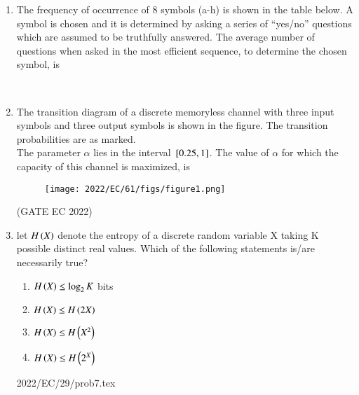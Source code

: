 \begin{enumerate}
\item The frequency of occurrence of 8 symbols (a-h) is shown in the table below. A
symbol is chosen and it is determined by asking a series of “yes/no” questions which
are assumed to be truthfully answered. The average number of questions when asked
in the most efficient sequence, to determine the chosen symbol, is \\
\begin{table}[h]
	
\end{table} \\
\solution

\item The transition diagram of a discrete memoryless channel with three input symbols
and three output symbols is shown in the figure. The transition probabilities are as
marked.\\
The parameter $\alpha$ lies in the interval ${}\left[0.25,1\right]$. The value of $\alpha$ for which the capacity of this channel is maximized, is
\begin{figure}[!ht]
\centering
\texttt{[image: 2022/EC/61/figs/figure1.png]}
\label{Fig:1}
\end{figure}
\hfill(GATE EC 2022)

\item let $H\left(X\right)$ denote the entropy of a discrete
random variable X taking K possible distinct
real values. Which of the following statements
is/are necessarily true?
\begin{enumerate}[label=(\Alph*)]
\item 
$H\left(X\right)\leq \log _{2} K$ bits\\
\item 
$H\left(X\right) \leq H\left(2X\right)$\\
\item
$H\left(X\right)\leq H\left(X^2\right)$\\
\item
$H\left(X\right) \leq H\left(2^X\right)$\\
\end{enumerate}
 {2022/EC/29/prob7.tex}
\end{enumerate}


